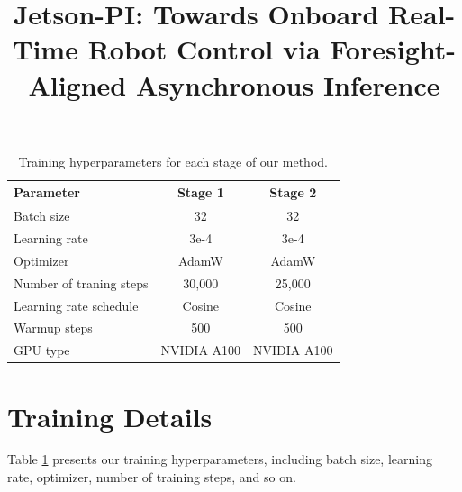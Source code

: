 \begin{table}[t]
\centering
\caption{Training hyperparameters for each stage of our method.}
\label{tab:training_hyperparams}
\renewcommand{\arraystretch}{1.2}
\begin{tabular}{l|c|c}
\hline
Parameter &Stage 1 & Stage 2\\
\hline
Batch size & 32 & 32 \\
Learning rate & 3e-4 & 3e-4 \\
Optimizer & AdamW & AdamW \\
Number of traning steps & 30{,}000 & 25{,}000  \\
Learning rate schedule & Cosine& Cosine\\
Warmup steps & 500 & 500 \\
GPU type & NVIDIA A100 & NVIDIA A100 \\
\hline
\end{tabular}
\end{table}


\section{Training Details}
Table \ref{tab:training_hyperparams} presents our training hyperparameters, including batch size, learning rate, optimizer, number of training steps, and so on.


\documentclass{article}

\usepackage[preprint]{corl_2026} %
\usepackage{amsmath}
\usepackage{graphicx}
\usepackage{multirow} 
\usepackage{wrapfig}
\usepackage{subcaption}
\usepackage{xcolor}
\usepackage{algorithm}      %
\usepackage{algpseudocode}  %

\title{Jetson-PI: Towards Onboard Real-Time Robot Control via Foresight-Aligned Asynchronous Inference}

%

